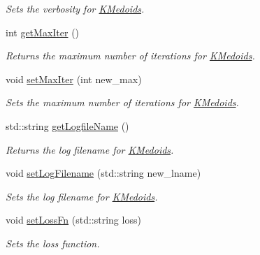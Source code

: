 \begin{DoxyCompactItemize}
\begin{DoxyCompactList}\small\item\em Sets the verbosity for \hyperlink{classKMedoids}{K\+Medoids}. \end{DoxyCompactList}\item 
int \hyperlink{classKMedoids_ac0569206113015abb38954f78a194eb5}{get\+Max\+Iter} ()
\begin{DoxyCompactList}\small\item\em Returns the maximum number of iterations for \hyperlink{classKMedoids}{K\+Medoids}. \end{DoxyCompactList}\item 
void \hyperlink{classKMedoids_ae1a84d5509090d31cd1c04616fd615f3}{set\+Max\+Iter} (int new\+\_\+max)
\begin{DoxyCompactList}\small\item\em Sets the maximum number of iterations for \hyperlink{classKMedoids}{K\+Medoids}. \end{DoxyCompactList}\item 
std\+::string \hyperlink{classKMedoids_ad5982ef2a71cce9f1f45b98c55350391}{get\+Logfile\+Name} ()
\begin{DoxyCompactList}\small\item\em Returns the log filename for \hyperlink{classKMedoids}{K\+Medoids}. \end{DoxyCompactList}\item 
void \hyperlink{classKMedoids_a45f89770245bff638e25bcd39ab52013}{set\+Log\+Filename} (std\+::string new\+\_\+lname)
\begin{DoxyCompactList}\small\item\em Sets the log filename for \hyperlink{classKMedoids}{K\+Medoids}. \end{DoxyCompactList}\item 
void \hyperlink{classKMedoids_ab442bf7198be7a48a7eb5901ac7ca571}{set\+Loss\+Fn} (std\+::string loss)
\begin{DoxyCompactList}\small\item\em Sets the loss function. \end{DoxyCompactList}\end{DoxyCompactItemize}
